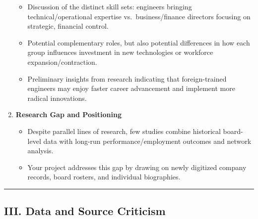 \documentclass[
]{article}
\providecommand{\tightlist}{%
  \setlength{\itemsep}{0pt}\setlength{\parskip}{0pt}}\usepackage{longtable,booktabs,array}
\begin{document}
\begin{enumerate}
  \begin{itemize}
  \tightlist
  \item
    Discussion of the distinct skill sets: engineers bringing
    technical/operational expertise vs.~business/finance directors
    focusing on strategic, financial control.\\
  \item
    Potential complementary roles, but also potential differences in how
    each group influences investment in new technologies or workforce
    expansion/contraction.\\
  \item
    Preliminary insights from research indicating that foreign-trained
    engineers may enjoy faster career advancement and implement more
    radical innovations.
  \end{itemize}
\item
  \textbf{Research Gap and Positioning}

  \begin{itemize}
  \tightlist
  \item
    Despite parallel lines of research, few studies combine historical
    board-level data with long-run performance/employment outcomes and
    network analysis.\\
  \item
    Your project addresses this gap by drawing on newly digitized
    company records, board rosters, and individual biographies.
  \end{itemize}
\end{enumerate}

\begin{center}\rule{0.5\linewidth}{0.5pt}\end{center}

\subsection{III. Data and Source
Criticism}\label{iii.-data-and-source-criticism}
\end{document}
